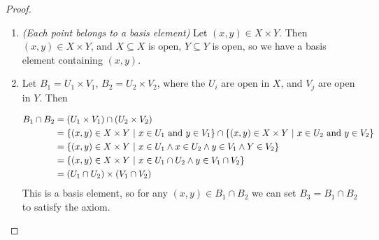 \documentclass[12pt, twosided]{article}
\begin{document}
\begin{proof}
  \begin{enumerate}
  \item \textit{(Each point belongs to a basis element)} Let \((x, y) \in X \times Y\). Then \((x, y) \in X \times Y\), and \(X \subseteq X\) is open, \(Y \subseteq Y\) is open, so we have a basis element containing \((x, y)\).
  \item Let \(B_1 = U_1 \times V_1\), \(B_2 = U_2 \times V_2\), where the \(U_i\) are open in \(X\), and \(V_j\) are open in \(Y\). Then

    \begin{align*}
      B_1 \cap B_2 &= (U_1 \times V_1) \cap (U_2 \times V_2) \\
                   &= \opn (x, y) \in X \times Y \stbar x \in U_1\ \mathrm{and}\ y \in V_1 \cls \cap \opn (x, y) \in X \times Y \stbar x \in U_2\ \mathrm{and}\ y \in V_2 \cls \\
                   &= \opn (x, y) \in X \times Y \stbar x \in U_1 \wedge x \in U_2 \wedge y \in V_1 \wedge Y \in V_2 \cls \\
                   &= \opn (x, y) \in X \times Y \stbar x \in U_1 \cap U_2 \wedge y \in V_1 \cap V_2 \cls \\
                   &= (U_1 \cap U_2) \times (V_1 \cap V_2)
    \end{align*}
    This is a basis element, so for any \((x, y) \in B_1 \cap B_2\) we can set \(B_3 = B_1 \cap B_2\) to satisfy the axiom.
  \end{enumerate}
\end{proof}
\end{document}
